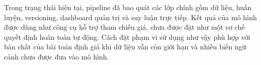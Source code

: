 
Trong trạng thái hiện tại, pipeline đã bao quát các lớp chính gồm dữ liệu, huấn luyện, versioning, dashboard quản trị và suy luận trực tiếp. Kết quả của mô hình được dùng như công cụ hỗ trợ tham chiếu giá, chưa được đặt như một cơ chế quyết định hoàn toàn tự động. Cách đặt phạm vi sử dụng như vậy phù hợp với bản chất của bài toán định giá khi dữ liệu vẫn còn giới hạn và nhiều biến ngữ cảnh chưa được đưa vào mô hình.

